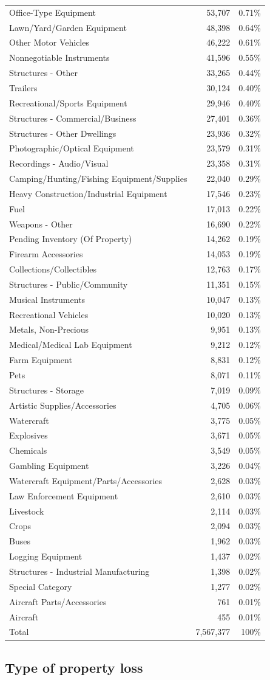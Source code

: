 \documentclass[
  12pt,
  openany]{book}
\begin{document}
\begin{longtable}[]{@{}lrr@{}}
Office-Type Equipment & 53,707 & 0.71\%\tabularnewline
Lawn/Yard/Garden Equipment & 48,398 & 0.64\%\tabularnewline
Other Motor Vehicles & 46,222 & 0.61\%\tabularnewline
Nonnegotiable Instruments & 41,596 & 0.55\%\tabularnewline
Structures - Other & 33,265 & 0.44\%\tabularnewline
Trailers & 30,124 & 0.40\%\tabularnewline
Recreational/Sports Equipment & 29,946 & 0.40\%\tabularnewline
Structures - Commercial/Business & 27,401 & 0.36\%\tabularnewline
Structures - Other Dwellings & 23,936 & 0.32\%\tabularnewline
Photographic/Optical Equipment & 23,579 & 0.31\%\tabularnewline
Recordings - Audio/Visual & 23,358 & 0.31\%\tabularnewline
Camping/Hunting/Fishing Equipment/Supplies & 22,040 & 0.29\%\tabularnewline
Heavy Construction/Industrial Equipment & 17,546 & 0.23\%\tabularnewline
Fuel & 17,013 & 0.22\%\tabularnewline
Weapons - Other & 16,690 & 0.22\%\tabularnewline
Pending Inventory (Of Property) & 14,262 & 0.19\%\tabularnewline
Firearm Accessories & 14,053 & 0.19\%\tabularnewline
Collections/Collectibles & 12,763 & 0.17\%\tabularnewline
Structures - Public/Community & 11,351 & 0.15\%\tabularnewline
Musical Instruments & 10,047 & 0.13\%\tabularnewline
Recreational Vehicles & 10,020 & 0.13\%\tabularnewline
Metals, Non-Precious & 9,951 & 0.13\%\tabularnewline
Medical/Medical Lab Equipment & 9,212 & 0.12\%\tabularnewline
Farm Equipment & 8,831 & 0.12\%\tabularnewline
Pets & 8,071 & 0.11\%\tabularnewline
Structures - Storage & 7,019 & 0.09\%\tabularnewline
Artistic Supplies/Accessories & 4,705 & 0.06\%\tabularnewline
Watercraft & 3,775 & 0.05\%\tabularnewline
Explosives & 3,671 & 0.05\%\tabularnewline
Chemicals & 3,549 & 0.05\%\tabularnewline
Gambling Equipment & 3,226 & 0.04\%\tabularnewline
Watercraft Equipment/Parts/Accessories & 2,628 & 0.03\%\tabularnewline
Law Enforcement Equipment & 2,610 & 0.03\%\tabularnewline
Livestock & 2,114 & 0.03\%\tabularnewline
Crops & 2,094 & 0.03\%\tabularnewline
Buses & 1,962 & 0.03\%\tabularnewline
Logging Equipment & 1,437 & 0.02\%\tabularnewline
Structures - Industrial Manufacturing & 1,398 & 0.02\%\tabularnewline
Special Category & 1,277 & 0.02\%\tabularnewline
Aircraft Parts/Accessories & 761 & 0.01\%\tabularnewline
Aircraft & 455 & 0.01\%\tabularnewline
Total & 7,567,377 & 100\%\tabularnewline
\bottomrule
\end{longtable}


\hypertarget{type-of-property-loss}{%
\subsection{Type of property loss}\label{type-of-property-loss}}
\end{document}

